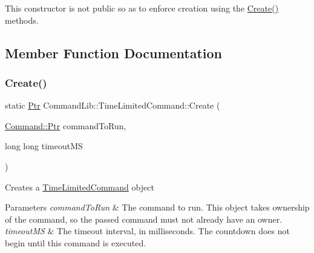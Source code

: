 This constructor is not public so as to enforce creation using the \mbox{\hyperlink{class_command_lib_1_1_time_limited_command_a7b8515c4f2780c7f5d8bc942affbc12b}{Create()}} methods. 



\subsection{Member Function Documentation}
\mbox{\label{class_command_lib_1_1_time_limited_command_a7b8515c4f2780c7f5d8bc942affbc12b}} 
\subsubsection{\texorpdfstring{Create()}{Create()}\hspace{0.1cm}{\footnotesize\ttfamily [1/2]}}
{\footnotesize\ttfamily static \mbox{\hyperlink{class_command_lib_1_1_command_a3b3e4f00144373299df5c6bb1acc319d}{Ptr}} Command\+Lib\+::\+Time\+Limited\+Command\+::\+Create (\begin{DoxyParamCaption}\item[{\mbox{\hyperlink{class_command_lib_1_1_command_a3b3e4f00144373299df5c6bb1acc319d}{Command\+::\+Ptr}}}]{command\+To\+Run,  }\item[{long long}]{timeout\+MS }\end{DoxyParamCaption})\hspace{0.3cm}{\ttfamily [static]}}



Creates a \mbox{\hyperlink{class_command_lib_1_1_time_limited_command}{Time\+Limited\+Command}} object 


\begin{DoxyParams}{Parameters}
{\em command\+To\+Run} & The command to run. This object takes ownership of the command, so the passed command must not already have an owner. \\
\hline
{\em timeout\+MS} & The timeout interval, in milliseconds. The countdown does not begin until this command is executed. \\
\hline
\end{DoxyParams}
\mbox{\label{class_command_lib_1_1_time_limited_command_a14e7e2915d660199c4433972a93515e7}} 
